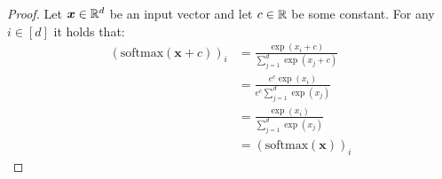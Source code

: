 \begin{proof}
  Let $\bm{x} \in \mathbb{R}^d$ be an input vector and let $c \in \mathbb{R}$ be some constant. For any $i \in [d]$ it holds that:  
  \begin{equation*}
    \begin{split}
      (\text{softmax}(\bm{x} + c))_i & = \frac{\exp(x_i + c)}{\sum_{j = 1}^{d} \exp(x_j + c)} \\
      & = \frac{e^c \exp(x_i)}{e^c \sum_{j = 1}^{d} \exp(x_j)} \\
      & = \frac{\exp(x_i)}{\sum_{j = 1}^{d} \exp(x_j)} \\
      & = (\text{softmax}(\bm{x}))_i
    \end{split}
  \end{equation*}
\end{proof}